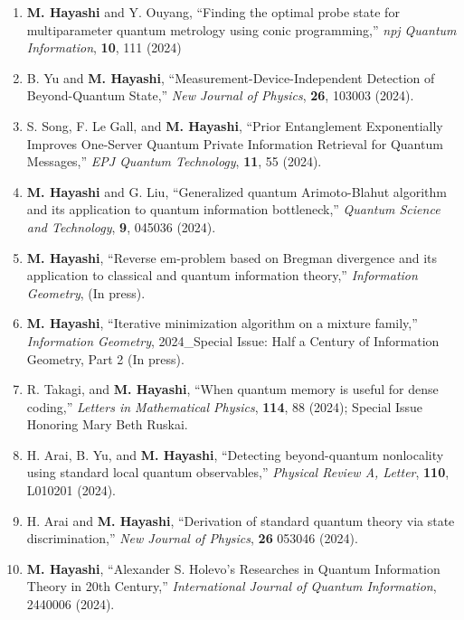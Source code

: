 \documentclass[a4paper,12pt,oneside]{article}
\begin{document}
\begin{enumerate}
\item
\textbf{M. Hayashi} and Y. Ouyang,
``Finding the optimal probe state for multiparameter quantum metrology using conic programming,''
{\em npj Quantum Information}, {\bf 10}, 111 (2024)

\item
B. Yu and \textbf{M. Hayashi}, 
``Measurement-Device-Independent Detection of Beyond-Quantum State,''
{\em New Journal of Physics},
{\bf 26}, 103003 (2024).

\item
S. Song, F. Le Gall, and \textbf{M. Hayashi}, 
``Prior Entanglement Exponentially Improves One-Server Quantum Private Information Retrieval for Quantum Messages,''
{\em EPJ Quantum Technology},
\textbf{11}, 55 (2024).

\item
\textbf{M. Hayashi} and G. Liu,
``Generalized quantum Arimoto-Blahut algorithm and its application to quantum information bottleneck,''
{\em Quantum Science and Technology},
\textbf{9}, 045036 (2024).

\item
\textbf{M. Hayashi}, 
``Reverse em-problem based on Bregman divergence and its application to classical and quantum information theory,''
{\em Information Geometry},
(In press).

\item
\textbf{M. Hayashi}, 
``Iterative minimization algorithm on a mixture family,''
{\em Information Geometry},
2024_Special Issue: Half a Century of Information Geometry, Part 2 (In press).

\item
R. Takagi, and \textbf{M. Hayashi}, 
``When quantum memory is useful for dense coding,''
{\em Letters in Mathematical Physics},
\textbf{114}, 88 (2024); Special Issue Honoring Mary Beth Ruskai.

\item
H. Arai, B. Yu, and \textbf{M. Hayashi}, 
``Detecting beyond-quantum nonlocality using standard local quantum observables,''
{\em Physical Review A, Letter},
\textbf{110}, L010201 (2024).

\item
H. Arai and \textbf{M. Hayashi}, 
``Derivation of standard quantum theory via state discrimination,''
{\em New Journal of Physics},
\textbf{26} 053046 (2024).

\item
\textbf{M. Hayashi}, 
``Alexander S. Holevo’s Researches in Quantum Information Theory in 20th Century,''
{\em International Journal of Quantum Information},
2440006 (2024).


\end{enumerate}
\end{document}
